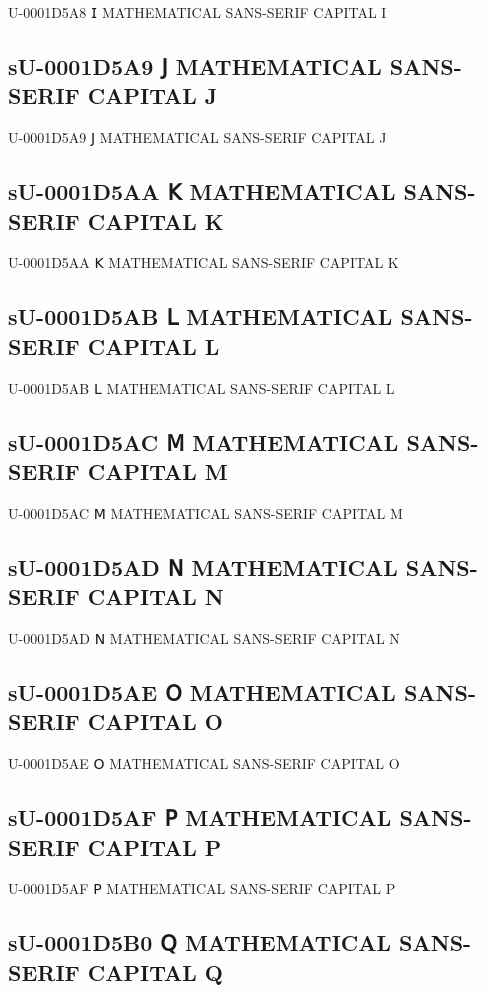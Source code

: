 U-0001D5A8 𝖨 MATHEMATICAL SANS-SERIF CAPITAL I

\subsection{sU-0001D5A9 𝖩 MATHEMATICAL SANS-SERIF CAPITAL J}

U-0001D5A9 𝖩 MATHEMATICAL SANS-SERIF CAPITAL J

\subsection{sU-0001D5AA 𝖪 MATHEMATICAL SANS-SERIF CAPITAL K}

U-0001D5AA 𝖪 MATHEMATICAL SANS-SERIF CAPITAL K

\subsection{sU-0001D5AB 𝖫 MATHEMATICAL SANS-SERIF CAPITAL L}

U-0001D5AB 𝖫 MATHEMATICAL SANS-SERIF CAPITAL L

\subsection{sU-0001D5AC 𝖬 MATHEMATICAL SANS-SERIF CAPITAL M}

U-0001D5AC 𝖬 MATHEMATICAL SANS-SERIF CAPITAL M

\subsection{sU-0001D5AD 𝖭 MATHEMATICAL SANS-SERIF CAPITAL N}

U-0001D5AD 𝖭 MATHEMATICAL SANS-SERIF CAPITAL N

\subsection{sU-0001D5AE 𝖮 MATHEMATICAL SANS-SERIF CAPITAL O}

U-0001D5AE 𝖮 MATHEMATICAL SANS-SERIF CAPITAL O

\subsection{sU-0001D5AF 𝖯 MATHEMATICAL SANS-SERIF CAPITAL P}

U-0001D5AF 𝖯 MATHEMATICAL SANS-SERIF CAPITAL P

\subsection{sU-0001D5B0 𝖰 MATHEMATICAL SANS-SERIF CAPITAL Q}

